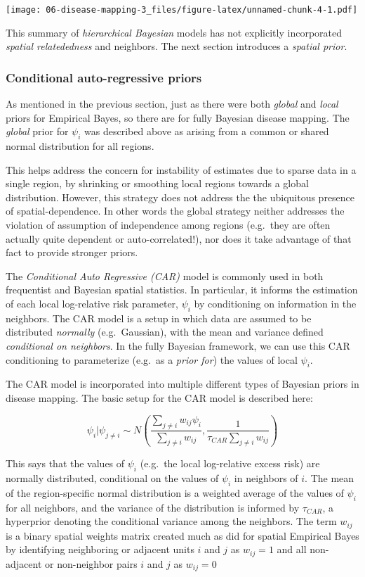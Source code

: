 \documentclass[
]{book}
\begin{document}
\texttt{[image: 06-disease-mapping-3\_files/figure-latex/unnamed-chunk-4-1.pdf]}

This summary of \emph{hierarchical Bayesian} models has not explicitly incorporated \emph{spatial relatededness} and neighbors. The next section introduces a \emph{spatial prior}.

\hypertarget{conditional-auto-regressive-priors}{%
\subsubsection{Conditional auto-regressive priors}\label{conditional-auto-regressive-priors}}

As mentioned in the previous section, just as there were both \emph{global} and \emph{local} priors for Empirical Bayes, so there are for fully Bayesian disease mapping. The \emph{global} prior for \(\psi_i\) was described above as arising from a common or shared normal distribution for all regions.

This helps address the concern for instability of estimates due to sparse data in a single region, by shrinking or smoothing local regions towards a global distribution. However, this strategy does not address the the ubiquitous presence of spatial-dependence. In other words the global strategy neither addresses the violation of assumption of independence among regions (e.g.~they are often actually quite dependent or auto-correlated!), nor does it take advantage of that fact to provide stronger priors.

The \emph{Conditional Auto Regressive (CAR)} model is commonly used in both frequentist and Bayesian spatial statistics. In particular, it informs the estimation of each local log-relative risk parameter, \(\psi_i\) by conditioning on information in the neighbors. The CAR model is a setup in which data are assumed to be distributed \emph{normally} (e.g.~Gaussian), with the mean and variance defined \emph{conditional on neighbors}. In the fully Bayesian framework, we can use this CAR conditioning to parameterize (e.g.~as a \emph{prior for}) the values of local \(\psi_i\).

The CAR model is incorporated into multiple different types of Bayesian priors in disease mapping. The basic setup for the CAR model is described here:

\[\psi_i|\psi_{j \neq i} \sim N\left(\frac{\sum_{j \neq i} w_{ij}\psi_i}{\sum_{j \neq i}w_{ij}}, \frac{1}{\tau_{CAR}\sum_{j \neq i}w_{ij}}\right)\]

This says that the values of \(\psi_i\) (e.g.~the local log-relative excess risk) are normally distributed, conditional on the values of \(\psi_i\) in neighbors of \(i\). The mean of the region-specific normal distribution is a weighted average of the values of \(\psi_i\) for all neighbors, and the variance of the distribution is informed by \(\tau_{CAR}\), a hyperprior denoting the conditional variance among the neighbors. The term \(w_{ij}\) is a binary spatial weights matrix created much as did for spatial Empirical Bayes by identifying neighboring or adjacent units \(i\) and \(j\) as \(w_{ij}=1\) and all non-adjacent or non-neighbor pairs \(i\) and \(j\) as \(w_{ij}=0\)
\end{document}
